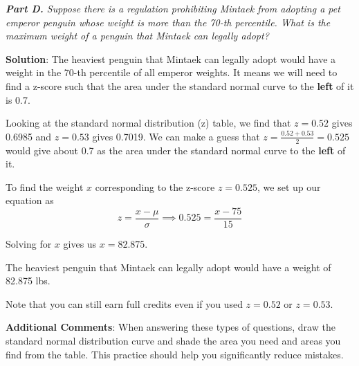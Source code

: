 \documentclass[12pt]{article}
\begin{document}
\textit{\textbf{Part D.} Suppose there is a regulation prohibiting Mintaek from adopting a pet emperor penguin whose weight is more than the 70-th percentile. What is the maximum weight of a penguin that Mintaek can legally adopt?}

\textbf{Solution}: The heaviest penguin that Mintaek can legally adopt would have a weight in the 70-th percentile of all emperor weights. It means we will need to find a z-score such that the area under the standard normal curve to the \textbf{left} of it is 0.7. 

Looking at the standard normal distribution (z) table, we find that $z = 0.52$ gives 0.6985 and $z = 0.53$ gives 0.7019. We can make a guess that $z = \frac{0.52 + 0.53}{2} = 0.525$ would give about 0.7 as the area under the standard normal curve to the \textbf{left} of it.

To find the weight $x$ corresponding to the z-score $z = 0.525$, we set up our equation as
\[ z = \dfrac{x - \mu}{\sigma} \implies 0.525 = \dfrac{x - 75}{15} \]

Solving for $x$ gives us $x = 82.875$.

The heaviest penguin that Mintaek can legally adopt would have a weight of 82.875 lbs.

Note that you can still earn full credits even if you used $z = 0.52$ or $z = 0.53$.

\textbf{Additional Comments}: When answering these types of questions, draw the standard normal distribution curve and shade the area you need and areas you find from the table. This practice should help you significantly reduce mistakes.
	
\end{document}
